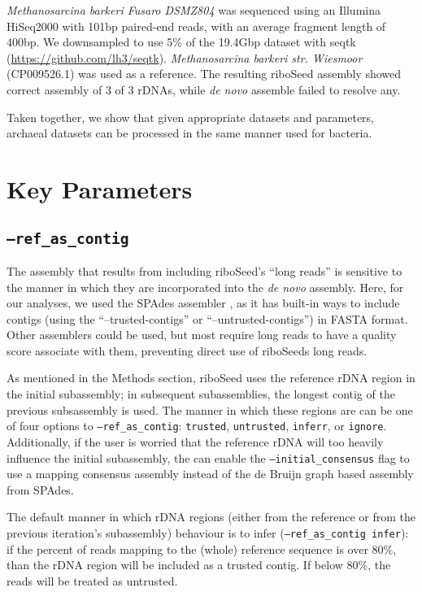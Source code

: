 \documentclass[10pt]{article}
\begin{document}
\textit{Methanosarcina barkeri Fusaro DSMZ804} was sequenced using an Illumina HiSeq2000 with 101bp paired-end reads, with an average fragment length of 400bp. We downsampled to use 5\% of the 19.4Gbp dataset with seqtk (\href{https://github.com/lh3/seqtk}{https://github.com/lh3/seqtk}). \textit{Methanosarcina barkeri str. Wiesmoor} (CP009526.1) was used as a reference. The resulting riboSeed assembly showed correct assembly of 3 of 3 rDNAs, while \textit{de novo} assemble failed to resolve any.

Taken together, we show that given appropriate datasets and parameters, archaeal datasets can be processed in the same manner used for bacteria.


\section*{Key Parameters}
\subsection*{\texttt{--ref\_as\_contig}}
The assembly that results from including riboSeed's ``long reads'' is sensitive to the manner in which they are incorporated into the \textit{de novo} assembly. Here, for our analyses, we used the SPAdes assembler \cite{Bankevich2012}, as it has built-in ways to include contigs (using the ``--trusted-contigs'' or ``--untrusted-contigs'') in FASTA format.  Other assemblers could be used, but most require long reads to have a quality score associate with them, preventing direct use of riboSeeds long reads.

As mentioned in the Methods section, riboSeed uses the reference rDNA region in the initial subassembly;  in subsequent subassemblies, the longest contig of the previous subsassembly is used.  The manner in which these regions are can be one of four options to \texttt{--ref\_as\_contig}: \texttt{trusted}, \texttt{untrusted}, \texttt{inferr}, or \texttt{ignore}.  Additionally, if the user is worried that the reference rDNA will too heavily influence the initial subassembly, the can enable the \texttt{--initial\_consensus} flag to use a mapping consensus assembly instead of the de Bruijn graph based assembly from SPAdes.

The default manner in which rDNA regions (either from the reference or from the previous iteration's subassembly) behaviour is to infer (\texttt{--ref\_as\_contig infer}): if the percent of reads mapping to  the (whole) reference sequence  is over 80\%, than the rDNA region will be included as a trusted contig.  If below 80\%, the reads will be treated as untrusted.
\end{document}
